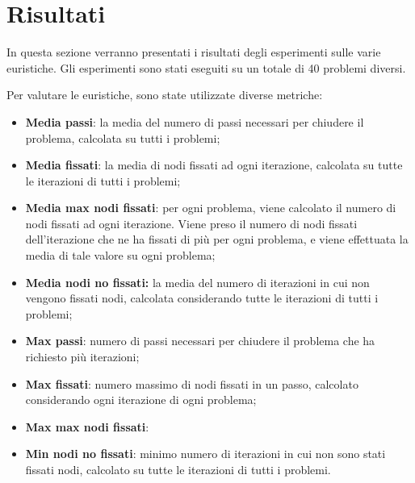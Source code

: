 \section{Risultati}
\label{sec:risultati}

In questa sezione verranno presentati i risultati degli esperimenti sulle varie euristiche. Gli esperimenti sono stati eseguiti su un totale di 40 problemi diversi. 

Per valutare le euristiche, sono state utilizzate diverse metriche:

\begin{itemize}
\item \textbf{Media passi}: la media del numero di passi necessari per chiudere il problema, calcolata su tutti i problemi;
\item \textbf{Media fissati}: la media di nodi fissati ad ogni iterazione, calcolata su tutte le iterazioni di tutti i problemi;
\item \textbf{Media max nodi fissati}: per ogni problema, viene calcolato il numero di nodi fissati ad ogni iterazione. Viene preso il numero di nodi fissati dell'iterazione che ne ha fissati di più per ogni problema, e viene effettuata la media di tale valore su ogni problema;
\item \textbf{Media nodi no fissati:} la media del numero di iterazioni in cui non vengono fissati nodi, calcolata considerando tutte le iterazioni di tutti i problemi;
\item \textbf{Max passi}: numero di passi necessari per chiudere il problema che ha richiesto più iterazioni;
\item \textbf{Max fissati}: numero massimo di nodi fissati in un passo, calcolato considerando ogni iterazione di ogni problema;
\item \textbf{Max max nodi fissati}:
\item \textbf{Min nodi no fissati}: minimo numero di iterazioni in cui non sono stati fissati nodi, calcolato su tutte le iterazioni di tutti i problemi.
\end{itemize}

